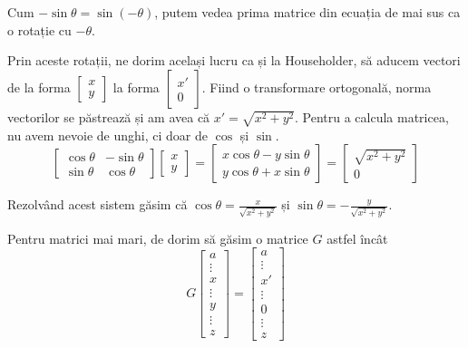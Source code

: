 \documentclass{exam}
\begin{document}
Cum $-\sin \theta = \sin(-\theta)$, putem vedea prima matrice din ecuația de mai
sus ca o rotație cu $-\theta$.

Prin aceste rotații, ne dorim același lucru ca și la Householder, să aducem
vectori de la forma $\begin{bmatrix} x \\ y \end{bmatrix}$ la forma
$\begin{bmatrix} x' \\ 0 \end{bmatrix}$. Fiind o transformare ortogonală, norma
vectorilor se păstrează și am avea că $x' = \sqrt{x^2 + y^2}$. Pentru a calcula
matricea, nu avem nevoie de unghi, ci doar de $\cos$ și $\sin$.
\begin{equation*}
	\begin{bmatrix} \cos \theta & -\sin \theta \\ \sin \theta & \cos \theta \end{bmatrix} \begin{bmatrix} x \\ y \end{bmatrix}
	= \begin{bmatrix} x \cos \theta - y \sin \theta \\ y \cos \theta + x \sin \theta \end{bmatrix}
	= \begin{bmatrix} \sqrt{x^2 + y^2} \\ 0 \end{bmatrix}
\end{equation*}

Rezolvând acest sistem găsim că $\cos \theta = \frac{x}{\sqrt{x^2 + y^2}}$ și
$\sin \theta = - \frac{y}{\sqrt{x^2 + y^2}}$.

Pentru matrici mai mari, de dorim să găsim o matrice $G$ astfel încât
\begin{equation*}
	G \begin{bmatrix} a \\ \vdots \\ x \\ \vdots \\ y \\ \vdots \\ z \end{bmatrix} = \begin{bmatrix} a \\ \vdots \\ x' \\ \vdots \\ 0 \\ \vdots \\ z \end{bmatrix}
\end{equation*}
\end{document}
